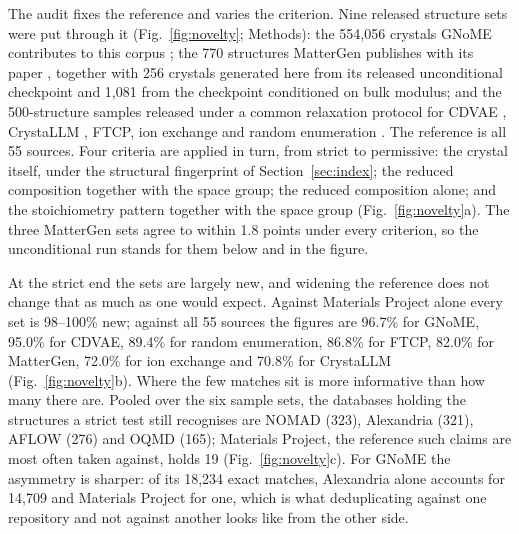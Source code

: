 The audit fixes the reference and varies the criterion. Nine released structure
sets were put through it (Fig.~\ref{fig:novelty}; Methods): the 554{,}056
crystals GNoME contributes to this corpus \cite{merchant2023scaling}; the 770
structures MatterGen publishes with its paper \cite{zeni2025generative}, together
with 256 crystals generated here from its released unconditional checkpoint and
1{,}081 from the checkpoint conditioned on bulk modulus; and the 500-structure
samples released under a common relaxation protocol for CDVAE
\cite{xie2022crystal}, CrystaLLM \cite{antunes2024crystal}, FTCP, ion exchange
and random enumeration \cite{szymanski2025baselines}. The reference is all 55
sources. Four criteria are applied in turn, from strict to permissive: the
crystal itself, under the structural fingerprint of Section~\ref{sec:index}; the
reduced composition together with the space group; the reduced composition alone;
and the stoichiometry pattern together with the space group
(Fig.~\ref{fig:novelty}a). The three MatterGen
sets agree to within 1.8 points under every criterion, so the unconditional run
stands for them below and in the figure.

At the strict end the sets are largely new, and widening the reference does not
change that as much as one would expect. Against Materials Project alone every
set is 98--100\% new; against all 55 sources the figures are 96.7\% for GNoME,
95.0\% for CDVAE, 89.4\% for random enumeration, 86.8\% for FTCP, 82.0\% for
MatterGen, 72.0\% for ion exchange and 70.8\% for CrystaLLM
(Fig.~\ref{fig:novelty}b). Where the few matches sit is more informative than how
many there are. Pooled over the six sample sets, the databases holding the
structures a strict test still recognises are NOMAD (323), Alexandria (321),
AFLOW (276) and OQMD (165); Materials Project, the reference such claims are most
often taken against, holds 19 (Fig.~\ref{fig:novelty}c). For GNoME the asymmetry
is sharper: of its 18{,}234 exact matches, Alexandria alone accounts for 14{,}709
and Materials Project for one, which is what deduplicating against one repository
and not against another looks like from the other side.

